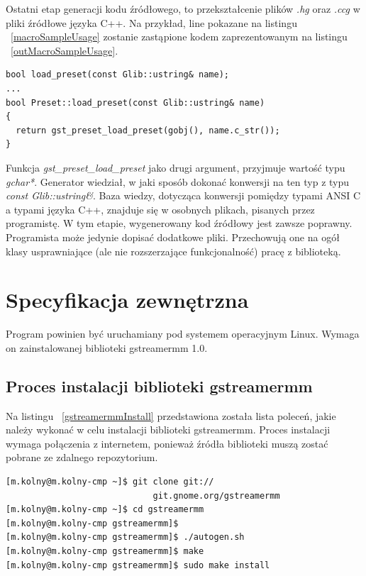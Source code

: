 \documentclass[12pt]{article}
\begin{document}
Ostatni etap generacji kodu źródłowego, to przekształcenie plików \textit{.hg} oraz \textit{.ccg} w pliki źródłowe języka C++. Na przykład, line pokazane na listingu ~\ref{macroSampleUsage} zostanie zastąpione kodem zaprezentowanym na listingu ~\ref{outMacroSampleUsage}.
    \begin{lstlisting}[caption=Kod źródłowy wygenerowany na podstawie makrodefinicji, label=outMacroSampleUsage]
bool load_preset(const Glib::ustring& name);
...
bool Preset::load_preset(const Glib::ustring& name)
{
  return gst_preset_load_preset(gobj(), name.c_str());
}
    \end{lstlisting}
    Funkcja \textit{gst\_preset\_load\_preset} jako drugi argument, przyjmuje wartość typu \textit{gchar*}. Generator wiedział, w jaki sposób dokonać konwersji na ten typ z typu \textit{const Glib::ustring\&}. Baza wiedzy, dotycząca konwersji pomiędzy typami ANSI C a typami języka C++, znajduje się w osobnych plikach, pisanych przez programistę.
W tym etapie, wygenerowany kod źródłowy jest zawsze poprawny. Programista może jedynie dopisać dodatkowe pliki. Przechowują one na ogół klasy usprawniające (ale nie rozszerzające funkcjonalność) pracę z biblioteką.
\cleardoublepage
\section{Specyfikacja zewnętrzna}
Program powinien być uruchamiany pod systemem operacyjnym Linux. Wymaga on zainstalowanej biblioteki gstreamermm 1.0.
\subsection{Proces instalacji biblioteki gstreamermm}
Na listingu ~\ref{gstreamermmInstall} przedstawiona została lista poleceń, jakie należy wykonać w celu instalacji biblioteki gstreamermm. Proces instalacji wymaga połączenia z internetem, ponieważ źródła biblioteki muszą zostać pobrane ze zdalnego repozytorium.
\begin{lstlisting}[caption=Polecenia kompilujące program gst-creator, label=gstreamermmInstall]
[m.kolny@m.kolny-cmp ~]$ git clone git://
                             git.gnome.org/gstreamermm
[m.kolny@m.kolny-cmp ~]$ cd gstreamermm
[m.kolny@m.kolny-cmp gstreamermm]$ 
[m.kolny@m.kolny-cmp gstreamermm]$ ./autogen.sh
[m.kolny@m.kolny-cmp gstreamermm]$ make
[m.kolny@m.kolny-cmp gstreamermm]$ sudo make install
\end{lstlisting}
\end{document}
